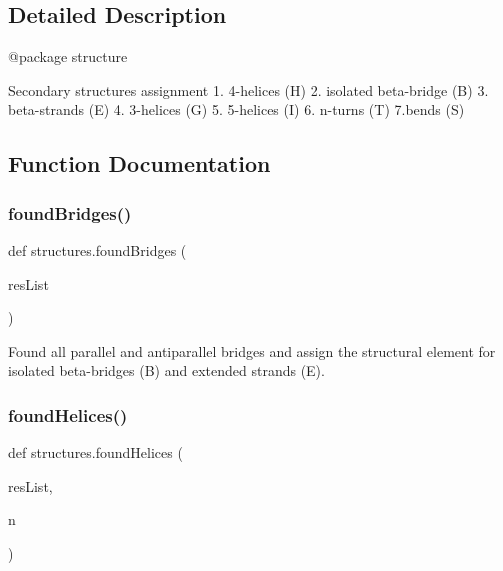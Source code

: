 \subsection{Detailed Description}
\begin{DoxyVerb}@package structure

Secondary structures assignment
    1. 4-helices (H)
    2. isolated beta-bridge (B)
    3. beta-strands (E)
    4. 3-helices (G)
    5. 5-helices (I)
    6. n-turns (T)
    7.bends (S)
\end{DoxyVerb}
 

\subsection{Function Documentation}
\mbox{\label{namespacestructures_a632bc453c2c7b8140249c8a91e03c06b}} 
\subsubsection{\texorpdfstring{found\+Bridges()}{foundBridges()}}
{\footnotesize\ttfamily def structures.\+found\+Bridges (\begin{DoxyParamCaption}\item[{}]{res\+List }\end{DoxyParamCaption})}

\begin{DoxyVerb}Found all parallel and antiparallel bridges and assign the structural element
for isolated beta-bridges (B) and extended strands (E).\end{DoxyVerb}
 \mbox{\label{namespacestructures_a9fb356db1094ae66a9880731f8b1de21}} 
\subsubsection{\texorpdfstring{found\+Helices()}{foundHelices()}}
{\footnotesize\ttfamily def structures.\+found\+Helices (\begin{DoxyParamCaption}\item[{}]{res\+List,  }\item[{}]{n }\end{DoxyParamCaption})}


